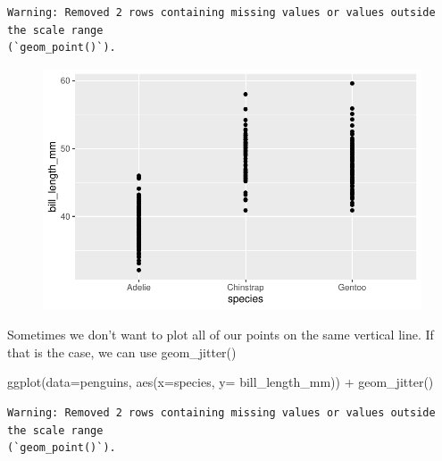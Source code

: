 \documentclass[
  letterpaper,
  DIV=11,
  numbers=noendperiod]{scrartcl}
\newenvironment{Shaded}{\begin{snugshade}}{\end{snugshade}}
\newcommand{\AttributeTok}[1]{\textcolor[rgb]{0.40,0.45,0.13}{#1}}
\newcommand{\FunctionTok}[1]{\textcolor[rgb]{0.28,0.35,0.67}{#1}}
\newcommand{\NormalTok}[1]{\textcolor[rgb]{0.00,0.23,0.31}{#1}}
\newcommand{\SpecialCharTok}[1]{\textcolor[rgb]{0.37,0.37,0.37}{#1}}
\begin{document}
\begin{verbatim}
Warning: Removed 2 rows containing missing values or values outside the scale range
(`geom_point()`).
\end{verbatim}

\begin{figure}[H]

{\centering \includegraphics{Lab_2_files/figure-pdf/unnamed-chunk-16-1.pdf}

}

\end{figure}

Sometimes we don't want to plot all of our points on the same vertical
line. If that is the case, we can use geom\_jitter()

\begin{Shaded}
\begin{Highlighting}[]
\FunctionTok{ggplot}\NormalTok{(}\AttributeTok{data=}\NormalTok{penguins, }\FunctionTok{aes}\NormalTok{(}\AttributeTok{x=}\NormalTok{species, }\AttributeTok{y=}\NormalTok{ bill\_length\_mm)) }\SpecialCharTok{+}
  \FunctionTok{geom\_jitter}\NormalTok{()}
\end{Highlighting}
\end{Shaded}

\begin{verbatim}
Warning: Removed 2 rows containing missing values or values outside the scale range
(`geom_point()`).
\end{verbatim}
\end{document}
